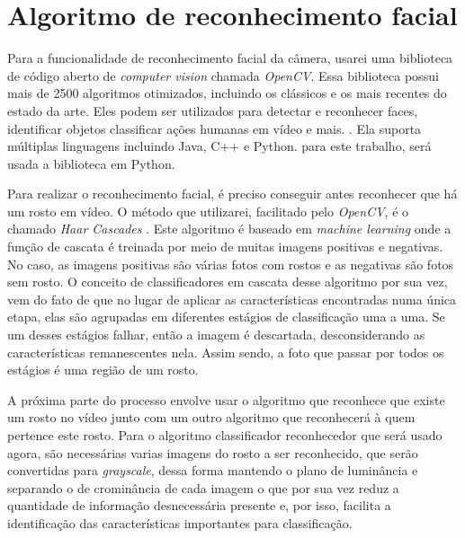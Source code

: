 \documentclass[12pt, %
openright, 
oneside, %
a4paper,    %
brazil]{facom-ufu-abntex2}
\begin{document}
\section{Algoritmo de reconhecimento facial}

Para a funcionalidade de reconhecimento facial da câmera, usarei uma biblioteca de código aberto
de \emph{computer vision} chamada \emph{OpenCV}. Essa biblioteca possui mais de 2500 algoritmos
otimizados, incluindo os clássicos e os mais recentes do estado da arte. Eles podem ser utilizados
para detectar e reconhecer faces, identificar objetos classificar ações humanas em vídeo e mais. \cite{opencv}.
Ela suporta múltiplas linguagens incluindo Java, C++ e Python. para este trabalho, será usada a biblioteca em Python.

Para realizar o reconhecimento facial, é preciso conseguir antes reconhecer que há um rosto em vídeo.
O método que utilizarei, facilitado pelo \emph{OpenCV}, é o chamado \emph{Haar Cascades} \cite{viola2001rapid}.
Este algoritmo é baseado em \emph{machine learning} onde a função de cascata é treinada por meio de muitas imagens positivas
e negativas. No caso, as imagens positivas são várias fotos com rostos e as negativas são fotos sem rosto. O conceito
de classificadores em cascata desse algoritmo por sua vez, vem do fato de que no lugar de aplicar as características
encontradas numa única etapa, elas são agrupadas em diferentes estágios de classificação uma a uma. Se um desses estágios
falhar, então a imagem é descartada, desconsiderando as características remanescentes nela. Assim sendo, a foto que passar
por todos os estágios é uma região de um rosto.

A próxima parte do processo envolve usar o algoritmo que reconhece que existe um rosto no vídeo junto com um outro
algoritmo que reconhecerá à quem pertence este rosto. Para o algoritmo classificador reconhecedor que será usado agora, são necessárias
varias imagens do rosto a ser reconhecido, que serão convertidas para \emph{grayscale}, dessa forma mantendo o plano de luminância
e separando o de crominância de cada imagem o que por sua vez reduz a quantidade de informação desnecessária presente e, por isso, facilita a identificação
das características importantes para classificação.




\end{document}
